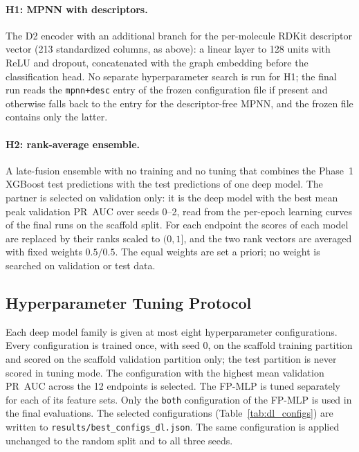 \paragraph{H1: MPNN with descriptors.}
The D2 encoder with an additional branch for the per-molecule RDKit descriptor vector (213 standardized columns, as above): a linear layer to 128 units with ReLU and dropout, concatenated with the graph embedding before the classification head. No separate hyperparameter search is run for H1; the final run reads the \texttt{mpnn+desc} entry of the frozen configuration file if present and otherwise falls back to the entry for the descriptor-free MPNN, and the frozen file contains only the latter.

\paragraph{H2: rank-average ensemble.}
A late-fusion ensemble with no training and no tuning that combines the Phase~1 XGBoost test predictions with the test predictions of one deep model. The partner is selected on validation only: it is the deep model with the best mean peak validation PR~AUC over seeds 0--2, read from the per-epoch learning curves of the final runs on the scaffold split. For each endpoint the scores of each model are replaced by their ranks scaled to $(0, 1]$, and the two rank vectors are averaged with fixed weights $0.5/0.5$. The equal weights are set a priori; no weight is searched on validation or test data.

\subsection{Hyperparameter Tuning Protocol}
Each deep model family is given at most eight hyperparameter configurations. Every configuration is trained once, with seed 0, on the scaffold training partition and scored on the scaffold validation partition only; the test partition is never scored in tuning mode. The configuration with the highest mean validation PR~AUC across the 12 endpoints is selected. The FP-MLP is tuned separately for each of its feature sets. Only the \texttt{both} configuration of the FP-MLP is used in the final evaluations. The selected configurations (Table~\ref{tab:dl_configs}) are written to \texttt{results/best\_configs\_dl.json}. The same configuration is applied unchanged to the random split and to all three seeds.

